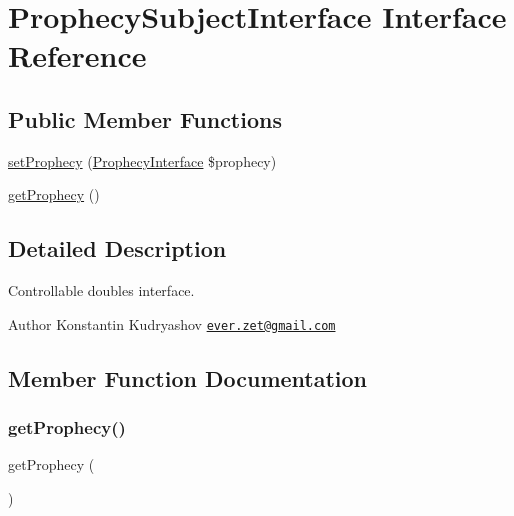 \hypertarget{interface_prophecy_1_1_prophecy_1_1_prophecy_subject_interface}{}\section{Prophecy\+Subject\+Interface Interface Reference}
\label{interface_prophecy_1_1_prophecy_1_1_prophecy_subject_interface}
\subsection*{Public Member Functions}
\begin{DoxyCompactItemize}
\item 
\mbox{\hyperlink{interface_prophecy_1_1_prophecy_1_1_prophecy_subject_interface_a52e5c2c0a923beb88fc581ce59bc5f96}{set\+Prophecy}} (\mbox{\hyperlink{interface_prophecy_1_1_prophecy_1_1_prophecy_interface}{Prophecy\+Interface}} \$prophecy)
\item 
\mbox{\hyperlink{interface_prophecy_1_1_prophecy_1_1_prophecy_subject_interface_ac07efcaea40897fa04eb7724234b2c1d}{get\+Prophecy}} ()
\end{DoxyCompactItemize}


\subsection{Detailed Description}
Controllable doubles interface.

\begin{DoxyAuthor}{Author}
Konstantin Kudryashov \href{mailto:ever.zet@gmail.com}{\tt ever.\+zet@gmail.\+com} 
\end{DoxyAuthor}


\subsection{Member Function Documentation}
\mbox{\label{interface_prophecy_1_1_prophecy_1_1_prophecy_subject_interface_ac07efcaea40897fa04eb7724234b2c1d}} 
\subsubsection{\texorpdfstring{get\+Prophecy()}{getProphecy()}}
{\footnotesize\ttfamily get\+Prophecy (\begin{DoxyParamCaption}{ }\end{DoxyParamCaption})}

